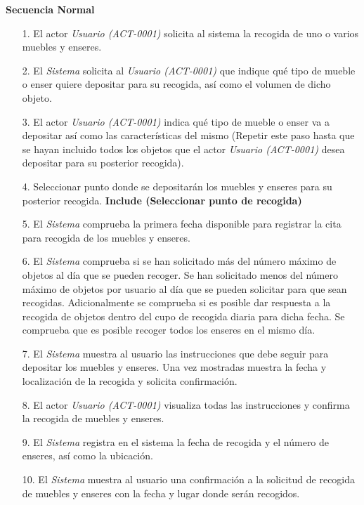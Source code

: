 \textbf{Secuencia Normal} 
\begin{enumerate}
	\item[1.] El actor \textit{Usuario (ACT-0001)} solicita al sistema la recogida de uno o varios muebles y enseres.
	\item[2.] El \textit{Sistema} solicita al \textit{Usuario (ACT-0001)} que indique qué tipo de mueble o enser quiere depositar para su recogida, así como el volumen de dicho objeto.
	\item[3.] El actor \textit{Usuario (ACT-0001)} indica qué tipo de mueble o enser va a depositar así como las características del mismo (Repetir este paso hasta que se hayan incluido todos los objetos que el actor \textit{Usuario (ACT-0001)} desea depositar para su posterior recogida).
	\item[4.] Seleccionar punto donde se depositarán los muebles y enseres para su posterior recogida. \textbf{Include (Seleccionar punto de recogida)}

	\item[5.] El \textit{Sistema} comprueba la primera fecha disponible para registrar la cita para recogida de los muebles y enseres.
	\item[6.] El \textit{Sistema} comprueba si se han solicitado más del número máximo de objetos al día que se pueden recoger. Se han solicitado menos del número máximo de objetos por usuario al día que se pueden solicitar para que sean recogidas. Adicionalmente se comprueba si es posible dar respuesta a la recogida de objetos dentro del cupo de recogida 	diaria para dicha fecha. Se comprueba que es posible recoger todos los enseres en el mismo día.
	\item[7.] El \textit{Sistema} muestra al usuario las instrucciones que debe seguir para depositar los muebles y enseres. Una vez mostradas muestra la fecha y localización de la recogida y solicita confirmación.
	\item[8.] El actor \textit{Usuario (ACT-0001)} visualiza todas las instrucciones y confirma la recogida de muebles y enseres.
	\item[9.] El \textit{Sistema} registra en el sistema la fecha de recogida y el número de enseres, así como la ubicación.
	\item[10.] El \textit{Sistema} muestra al usuario una confirmación a la solicitud de recogida de muebles y enseres con la fecha y lugar donde serán recogidos.
\end{enumerate} 

